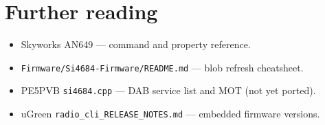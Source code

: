 \section{Further reading}
\label{sec:si4684-reading}

\begin{itemize}
  \item Skyworks AN649 --- command and property reference.
  \item \texttt{Firmware/Si4684-Firmware/README.md} --- blob refresh cheatsheet.
  \item PE5PVB \texttt{si4684.cpp} --- DAB service list and MOT (not yet ported).
  \item uGreen \texttt{radio\_cli\_RELEASE\_NOTES.md} --- embedded firmware versions.
\end{itemize}
